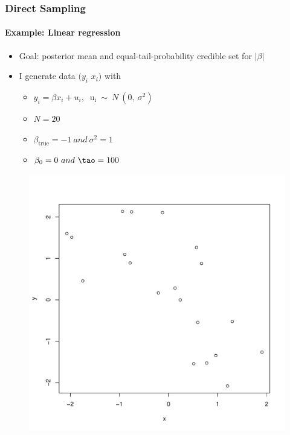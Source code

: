 \documentclass[
  shownotes,
  xcolor={svgnames},
  hyperref={colorlinks,citecolor=DarkBlue,linkcolor=DarkRed,urlcolor=DarkBlue}
  , aspectratio=169]{beamer}
\begin{document}
\begin{frame}[fragile]
\frametitle{Direct Sampling}
\framesubtitle{Example: Linear regression}

\begin{itemize}
\item Goal: posterior mean and equal-tail-probability credible set for $|\beta|$
\medskip


\item I generate data $(y_{i}$ $x_{i})$ with
\begin{itemize}
\item $ y_{i} = \beta x_{i} + u_{i},\ \text{\ \ u}_{\text{i\ }}\sim\ N\ (0,\ \sigma^{2})$

\item $N = 20$

\item $\beta_{\text{true}} = - 1\ and\ \sigma^{2} = 1$

\item $\beta_{0} = 0\ and\ \tao = 100$
\end{itemize}
\end{itemize}

\begin{figure}[H] \centering
  \centering
  \includegraphics[scale=0.25]{figures/scatter}
  \\
  \tiny 
\end{figure}
\end{frame}
\end{document}
